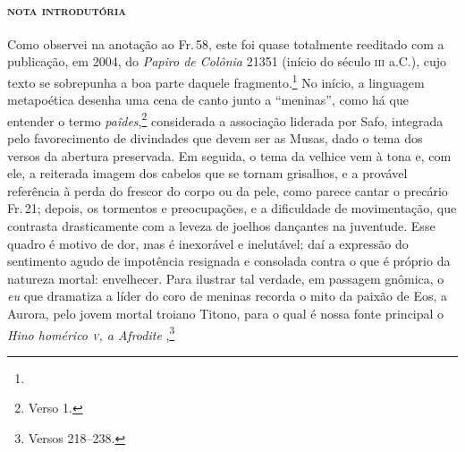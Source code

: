 {\paragraph{\textsc{nota introdutória}}
Como observei na anotação ao Fr.\,58, este foi quase totalmente reeditado com a 
publicação, em 2004, do \textit{Papiro de Colônia} 21351 (início do século \textsc{iii} a.C.), 
cujo texto se sobrepunha a boa parte daquele fragmento.\footnote{} No início, a 
linguagem metapoética desenha uma cena de canto junto a ``meninas'', como há que entender o termo \textit{paîdes},\footnote{Verso 1.} considerada a associação liderada por Safo, 
integrada pelo favorecimento de divindades que devem ser as Musas,
dado o tema dos versos da abertura preservada. Em seguida, o tema da velhice
vem à tona e, com ele, a reiterada imagem dos cabelos que se tornam grisalhos,
e a provável referência à perda do frescor do corpo ou da pele, como parece cantar o precário Fr.\,21; depois, os
tormentos e preocupações, e a dificuldade de movimentação, que contrasta
drasticamente com a leveza de joelhos dançantes na juventude. Esse quadro é
motivo de dor, mas é inexorável e inelutável; daí a expressão do sentimento
agudo de impotência resignada e consolada contra o que é próprio da natureza mortal: envelhecer. Para
ilustrar tal verdade, em passagem gnômica, o \textit{eu} que dramatiza a líder do coro de meninas recorda o
mito da paixão de Eos, a Aurora, pelo jovem mortal troiano Titono, para o qual é nossa fonte
principal o \textit{Hino homérico \textsc{v}, a Afrodite },\footnote{Versos 218--238.} }
